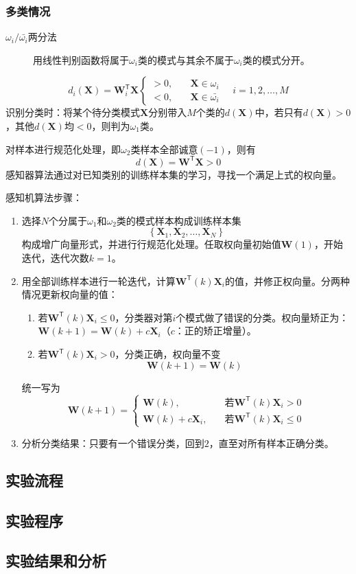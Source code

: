 \subsubsection{多类情况}
\begin{description}
	\item[$\omega_i/\bar{\omega_i}$两分法] 用线性判别函数将属于$\omega_i$类的模式与其余不属于$\omega_i$类的模式分开。
\end{description}
\[ d_i(\mathbf{X})=\mathbf{W}_i^\mathsf{T}\mathbf{X}\begin{cases}
>0,\quad& \mathbf{X}\in\omega_i \\
<0,\quad& \mathbf{X}\in\bar{\omega_i}
\end{cases} \quad i=1,2,\dots,M \]
识别分类时：将某个待分类模式$\mathbf{X}$分别带入$M$个类的$d(\mathbf{X})$中，若只有$d(\mathbf{X})>0$，其他$d(\mathbf{X})$均$<0$，则判为$\omega_1$类。

对样本进行规范化处理，即$\omega_2$类样本全部诚意$(-1)$，则有
\[ d(\mathbf{X})=\mathbf{W}^\mathsf{T}\mathbf{X}>0 \]
感知器算法通过对已知类别的训练样本集的学习，寻找一个满足上式的权向量。

感知机算法步骤：
\begin{enumerate}
	\item 选择$N$个分属于$\omega_1$和$\omega_2$类的模式样本构成训练样本集
	\[ \left\lbrace \mathbf{X}_1,\mathbf{X}_2,\dots,\mathbf{X}_N \right\rbrace \]
	构成增广向量形式，并进行行规范化处理。任取权向量初始值$\mathbf{W}(1)$，开始迭代，迭代次数$k=1$。
	\item 用全部训练样本进行一轮迭代，计算$\mathbf{W}^\mathsf{T}(k)\mathbf{X}_i$的值，并修正权向量。分两种情况更新权向量的值：
	\begin{enumerate}
		\item 若$\mathbf{W}^\mathsf{T}(k)\mathbf{X}_i\leq 0$，分类器对第$i$个模式做了错误的分类。权向量矫正为：$\mathbf{W}(k+1)=\mathbf{W}(k)+c\mathbf{X}_i$（$c$：正的矫正增量）。
		\item 若$\mathbf{W}^\mathsf{T}(k)\mathbf{X}_i> 0$，分类正确，权向量不变
		\[ \mathbf{W}(k+1)=\mathbf{W}(k) \]
	\end{enumerate}
	统一写为
	\[ \mathbf{W}(k+1)=\begin{cases}
	\mathbf{W}(k),\quad & \text{若}\mathbf{W}^\mathsf{T}(k)\mathbf{X}_i > 0 \\
	\mathbf{W}(k)+c\mathbf{X}_i, \quad & \text{若}\mathbf{W}^\mathsf{T}(k)\mathbf{X}_i \leq 0
	\end{cases} \]
	\item 分析分类结果：只要有一个错误分类，回到$2$，直至对所有样本正确分类。
\end{enumerate}
\subsection{实验流程}
\subsection{实验程序}
\subsection{实验结果和分析}